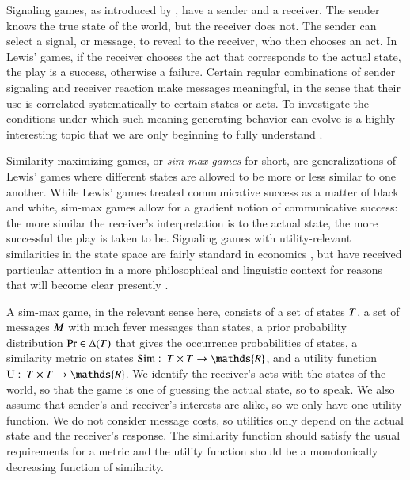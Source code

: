 \documentclass[fleqn,reqno,10pt]{article}
\newcommand{\similarity}{\ensuremath{\mathrm{Sim}}} %
\begin{document}
Signaling games, as introduced by \citet{Lewis_1969:Convention}, have
a sender and a receiver. The sender knows the true state of the world,
but the receiver does not. The sender can select a signal, or message,
to reveal to the receiver, who then chooses an act. In Lewis' games,
if the receiver chooses the act that corresponds to the actual state,
the play is a success, otherwise a failure. Certain regular
combinations of sender signaling and receiver reaction make messages
meaningful, in the sense that their use is correlated systematically
to certain states or acts. To investigate the conditions under which
such meaning-generating behavior can evolve is a highly interesting
topic that we are only beginning to fully understand
\citep[e.g.][]{Warneryd1993:Cheap-Talk-Coor,BlumeKim1993:Evolutionary-St,Huttegger2007:Evolution-and-t,Pawlowitsch2008:Why-Evolution-d,Barrett2009:The-Evolution-o,HutteggerSkyrms2010:Evolutionary-Dy,Skyrms2010:Signals}.

Similarity-maximizing games, or \emph{sim-max games} for short, are
generalizations of Lewis' games where different states are allowed to
be more or less similar to one another. While Lewis' games treated
communicative success as a matter of black and white, sim-max games
allow for a gradient notion of communicative success: the more similar
the receiver's interpretation is to the actual state, the more
successful the play is taken to be. Signaling games with
utility-relevant similarities in the state space are fairly standard
in economics
\citep[e.g.][]{Spence1973:Job-market-sign,CrawfordSobel1982:Strategic-Infor},
but have received particular attention in a more philosophical and
linguistic context for reasons that will become clear presently
\citep{Jager2007:The-Evolution-o,JagerRooijvan-Rooij2007:Language-Struct,JagerMetzger2011:Voronoi-Languag}.

A sim-max game, in the relevant sense here, consists of a set of
states $T$, a set of messages $M$ with much fever messages
than states, a prior probability distribution $\Pr \in
\Delta(T)$ that gives the occurrence probabilities of states, a
similarity metric on states $\similarity \mycolon \States \times
\States \rightarrow \mathds{R}$, and a utility function $\Utils
\mycolon \States \times \States \rightarrow \mathds{R}$. We identify
the receiver's acts with the states of the world, so that the game is
one of guessing the actual state, so to speak. We also assume that
sender's and receiver's interests are alike, so we only have one
utility function. We do not consider message costs, so utilities only
depend on the actual state and the receiver's response. The
similarity function should satisfy the usual requirements for a metric
and the utility function should be a monotonically decreasing function
of similarity.
\end{document}

